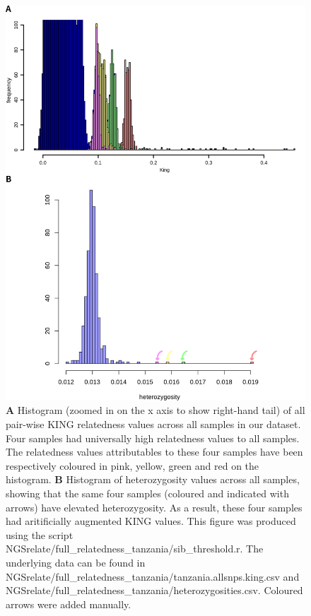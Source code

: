 \documentclass[a4paper,12pt]{article}
\begin{document}
\clearpage


\begin{figure}[h]
	\begin{center}
		\includegraphics*[width = 15cm]{odd_samples.png}
		\caption{\footnotesize \textbf{A} Histogram (zoomed in on the x axis to show right-hand tail) of all pair-wise KING relatedness values across all samples in our dataset. Four samples had universally high relatedness values to all samples. The relatedness values attributables to these four samples have been respectively coloured in pink, yellow, green and red on the histogram. \textbf{B} Histogram of heterozygosity values across all samples, showing that the same four samples (coloured and indicated with arrows) have elevated heterozygosity. As a result, these four samples had aritificially augmented KING values. This figure was produced using the script NGSrelate/full\_relatedness\_tanzania/sib\_threshold.r. The underlying data can be found in NGSrelate/full\_relatedness\_tanzania/tanzania.allsnps.king.csv and NGSrelate/full\_relatedness\_tanzania/heterozygosities.csv. Coloured arrows were added manually.}
	\end{center}
	\label{FigS2}
\end{figure}
\end{document}
